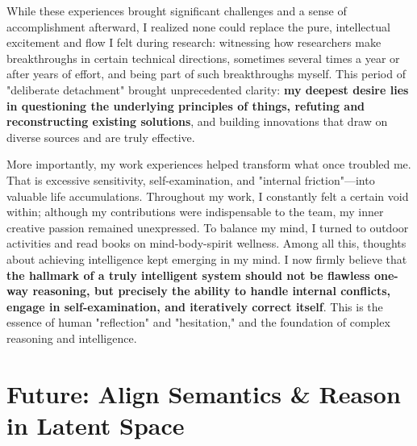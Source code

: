 \documentclass[11pt, letterpaper]{article}
\let\oldtextbf\textbf
\renewcommand{\textbf}[1]{{\color{black}\oldtextbf{#1}}}
\begin{document}
While these experiences brought significant challenges and a sense of accomplishment afterward, I realized none could replace the pure, intellectual excitement and flow I felt during research: witnessing how researchers make breakthroughs in certain technical directions, sometimes several times a year or after years of effort, and being part of such breakthroughs myself. This period of "deliberate detachment" brought unprecedented clarity: \textbf{my deepest desire lies in questioning the underlying principles of things, refuting and reconstructing existing solutions}, and building innovations that draw on diverse sources and are truly effective.

More importantly, my work experiences helped transform what once troubled me. That is excessive sensitivity, self-examination, and "internal friction"—into valuable life accumulations. Throughout my work, I constantly felt a certain void within; although my contributions were indispensable to the team, my inner creative passion remained unexpressed. To balance my mind, I turned to outdoor activities and read books on mind-body-spirit wellness. Among all this, thoughts about achieving intelligence kept emerging in my mind. I now firmly believe that \textbf{the hallmark of a truly intelligent system should not be flawless one-way reasoning, but precisely the ability to handle internal conflicts, engage in self-examination, and iteratively correct itself}. This is the essence of human "reflection" and "hesitation," and the foundation of complex reasoning and intelligence.

\section{Future: Align Semantics \& Reason in Latent Space}
\end{document}
